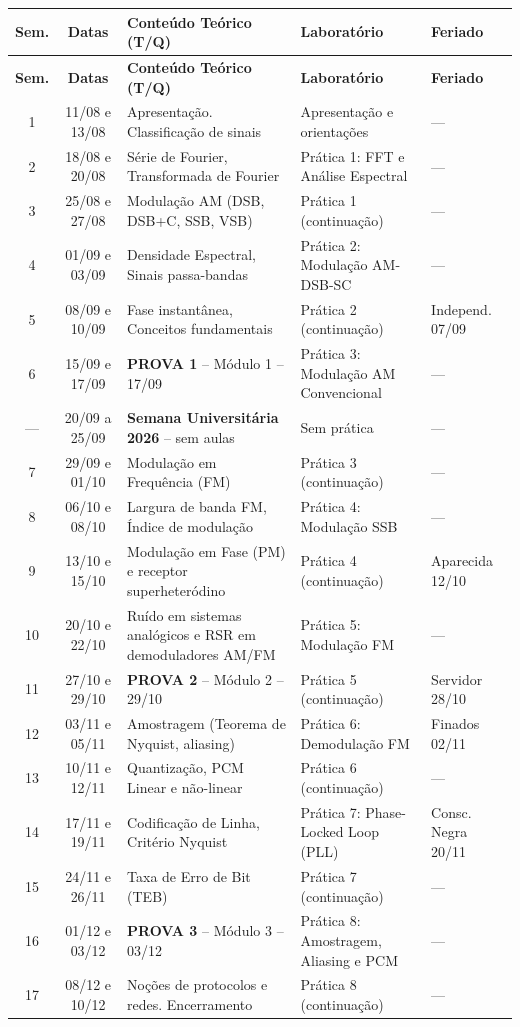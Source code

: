 \documentclass[11pt,a4paper]{article}
\begin{document}
\begin{center}
\small
\begin{longtable}{|c|c|p{5.0cm}|p{4.0cm}|p{1.8cm}|}
\hline
\textbf{Sem.} & \textbf{Datas} & \textbf{Conteúdo Teórico (T/Q)} & \textbf{Laboratório} & \textbf{Feriado} \\
\hline
\endfirsthead

\hline
\textbf{Sem.} & \textbf{Datas} & \textbf{Conteúdo Teórico (T/Q)} & \textbf{Laboratório} & \textbf{Feriado} \\
\hline
\endhead

\hline
\endfoot

1 & 11/08 e 13/08 & Apresentação. Classificação de sinais & Apresentação e orientações & --- \\
\hline
2 & 18/08 e 20/08 & Série de Fourier, Transformada de Fourier & Prática 1: FFT e Análise Espectral & --- \\
\hline
3 & 25/08 e 27/08 & Modulação AM (DSB, DSB+C, SSB, VSB) & Prática 1 (continuação) & --- \\
\hline
4 & 01/09 e 03/09 & Densidade Espectral, Sinais passa-bandas & Prática 2: Modulação AM-DSB-SC & --- \\
\hline
5 & 08/09 e 10/09 & Fase instantânea, Conceitos fundamentais & Prática 2 (continuação) & Independ. 07/09 \\
\hline
6 & 15/09 e 17/09 & \textbf{PROVA 1} -- Módulo 1 -- 17/09 & Prática 3: Modulação AM Convencional & --- \\
\hline
--- & 20/09 a 25/09 & \textbf{Semana Universitária 2026} -- sem aulas & Sem prática & --- \\
\hline
7 & 29/09 e 01/10 & Modulação em Frequência (FM) & Prática 3 (continuação) & --- \\
\hline
8 & 06/10 e 08/10 & Largura de banda FM, Índice de modulação & Prática 4: Modulação SSB & --- \\
\hline
9 & 13/10 e 15/10 & Modulação em Fase (PM) e receptor superheteródino & Prática 4 (continuação) & Aparecida 12/10 \\
\hline
10 & 20/10 e 22/10 & Ruído em sistemas analógicos e RSR em demoduladores AM/FM & Prática 5: Modulação FM & --- \\
\hline
11 & 27/10 e 29/10 & \textbf{PROVA 2} -- Módulo 2 -- 29/10 & Prática 5 (continuação) & Servidor 28/10 \\
\hline
12 & 03/11 e 05/11 & Amostragem (Teorema de Nyquist, aliasing) & Prática 6: Demodulação FM & Finados 02/11 \\
\hline
13 & 10/11 e 12/11 & Quantização, PCM Linear e não-linear & Prática 6 (continuação) & --- \\
\hline
14 & 17/11 e 19/11 & Codificação de Linha, Critério Nyquist & Prática 7: Phase-Locked Loop (PLL) & Consc. Negra 20/11 \\
\hline
15 & 24/11 e 26/11 & Taxa de Erro de Bit (TEB) & Prática 7 (continuação) & --- \\
\hline
16 & 01/12 e 03/12 & \textbf{PROVA 3} -- Módulo 3 -- 03/12 & Prática 8: Amostragem, Aliasing e PCM & --- \\
\hline
17 & 08/12 e 10/12 & Noções de protocolos e redes. Encerramento & Prática 8 (continuação) & --- \\
\hline


\end{longtable}
\end{center}
\end{document}
